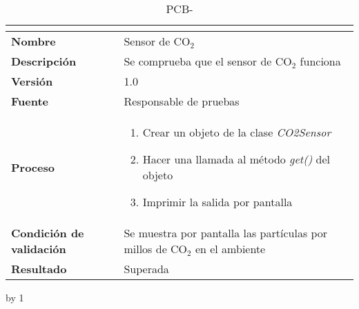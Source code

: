 \begin{table}[H]
	\caption{PCB-\number\pcb}
	\begin{tabular}{|l|p{}|}
		\hline
		\multicolumn{2}{|c|}{\cellcolor[HTML]{BFBFBF}{\color[HTML]{000000} \textbf{PCB-\number\pcb}}} \\ \hline
		\textbf{Nombre}                  & Sensor de CO$_2$                                                           \\ \hline
		\textbf{Descripción}             & Se comprueba que el sensor de CO$_2$ funciona                              \\ \hline
		\textbf{Versión}                 & 1.0                                                                        \\ \hline
		\textbf{Fuente}                  & Responsable de pruebas                                                     \\ \hline
		\textbf{Proceso}                 & \begin{enumerate}
			\item Crear un objeto de la clase \textit{CO2Sensor}
			\item Hacer una llamada al método \textit{get()} del objeto
			\item Imprimir la salida por pantalla
		\end{enumerate}                                                 \\ \hline
		\textbf{Condición de validación} & Se muestra por pantalla las partículas por millos de CO$_2$ en el ambiente \\ \hline
		\textbf{Resultado}               & Superada                                                                   \\ \hline
	\end{tabular}
\end{table}
\advance\pcb by 1

